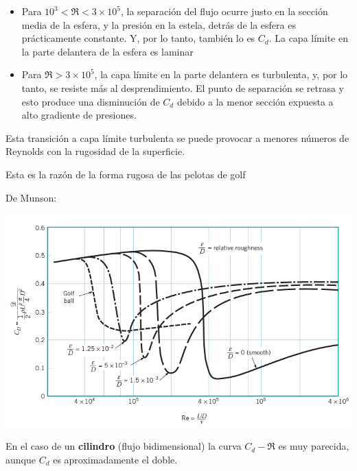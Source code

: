 	\begin{itemize}
		\item Para $10^{3}<\Re<3\times10^{5}$, la separación del flujo ocurre justo
		en la sección media de la esfera, y la presión en la estela, detrás
		de la esfera es prácticamente constante. Y, por lo tanto, también
		lo es $C_{d}$. La capa límite en la parte delantera de la esfera
		es laminar 
		\item Para $\Re>3\times10^{5}$, la capa límite en la parte delantera es
		turbulenta, y, por lo tanto, se resiste más al desprendimiento. El
		punto de separación se retrasa y esto produce una disminución de $C_{d}$
		debido a la menor sección expuesta a alto gradiente de presiones. 
	\end{itemize}

	
	\begin{minipage}[c]{0.4\textwidth}%
		Esta transición a capa límite turbulenta se puede provocar a menores
		números de Reynolds con la rugosidad de la superficie.
		
		Esta es la razón de la forma rugosa de las pelotas de golf %
	\end{minipage} %
	\begin{minipage}[c]{0.5\textwidth}%
		De Munson\cite{Munson}:
\begin{center}
	\includegraphics[width=\linewidth]{TeX_files/chapter09-Externo/roughSphere.png}
\end{center}
	\end{minipage}
	
	\smallskip{}
	En el caso de un \textbf{cilindro} (flujo bidimensional) la curva
	$C_{d}-\Re$ es muy parecida, aunque $C_{d}$ es aproximadamente el
	doble.\smallskip{}
	
